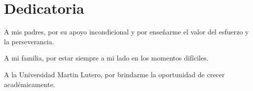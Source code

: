 \section*{Dedicatoria}

A mis padres, por su apoyo incondicional y por enseñarme el valor del esfuerzo y la perseverancia.

A mi familia, por estar siempre a mi lado en los momentos difíciles.

A la Universidad Martin Lutero, por brindarme la oportunidad de crecer académicamente.